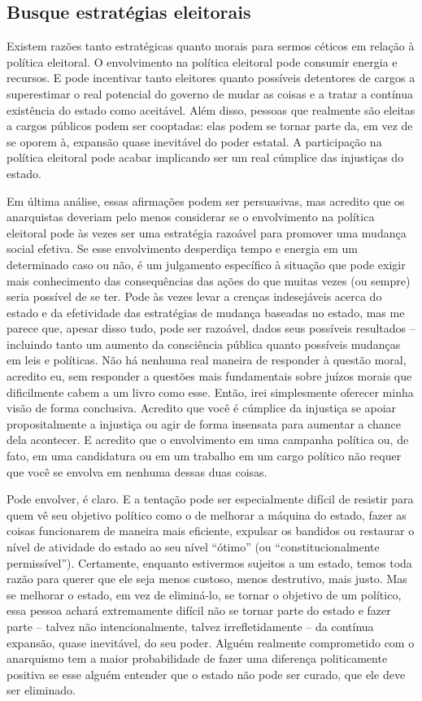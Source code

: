 \subsection*{Busque estratégias eleitorais}

Existem razões tanto estratégicas quanto morais para sermos céticos em relação à política eleitoral. O envolvimento na política eleitoral pode consumir energia e recursos. E pode incentivar tanto eleitores quanto possíveis detentores de cargos a superestimar o real potencial do governo de mudar as coisas e a tratar a contínua existência do estado como aceitável. Além disso, pessoas que realmente são eleitas a cargos públicos podem ser cooptadas: elas podem se tornar parte da, em vez de se oporem à, expansão quase inevitável do poder estatal. A participação na política eleitoral pode acabar implicando ser um real cúmplice das injustiças do estado.

Em última análise, essas afirmações podem ser persuasivas, mas acredito que os anarquistas deveriam pelo menos considerar se o envolvimento na política eleitoral pode às vezes ser uma estratégia razoável para promover uma mudança social efetiva. Se esse envolvimento desperdiça tempo e energia em um determinado caso ou não, é um julgamento específico à situação que pode exigir mais conhecimento das consequências das ações do que muitas vezes (ou sempre) seria possível de se ter. Pode às vezes levar a crenças indesejáveis acerca do estado e da efetividade das estratégias de mudança baseadas no estado, mas me parece que, apesar disso tudo, pode ser razoável, dados seus possíveis resultados -- incluindo tanto um aumento da consciência pública quanto possíveis mudanças em leis e políticas. Não há nenhuma real maneira de responder à questão moral, acredito eu, sem responder a questões mais fundamentais sobre juízos morais que dificilmente cabem a um livro como esse. Então, irei simplesmente oferecer minha visão de forma conclusiva. Acredito que você é cúmplice da injustiça se apoiar propositalmente a injustiça ou agir de forma insensata para aumentar a chance dela acontecer. E acredito que o envolvimento em uma campanha política ou, de fato, em uma candidatura ou em um trabalho em um cargo político não requer que você se envolva em nenhuma dessas duas coisas.

Pode envolver, é claro. E a tentação pode ser especialmente difícil de resistir para quem vê seu objetivo político como o de melhorar a máquina do estado, fazer as coisas funcionarem de maneira mais eficiente, expulsar os bandidos ou restaurar o nível de atividade do estado ao seu nível ``ótimo'' (ou ``constitucionalmente permissível''). Certamente, enquanto estivermos sujeitos a um estado, temos toda razão para querer que ele seja menos custoso, menos destrutivo, mais justo. Mas se melhorar o estado, em vez de eliminá-lo, se tornar o objetivo de um político, essa pessoa achará extremamente difícil não se tornar parte do estado e fazer parte -- talvez não intencionalmente, talvez irrefletidamente -- da contínua expansão, quase inevitável, do seu poder. Alguém realmente comprometido com o anarquismo tem a maior probabilidade de fazer uma diferença politicamente positiva se esse alguém entender que o estado não pode ser curado, que ele deve ser eliminado.

